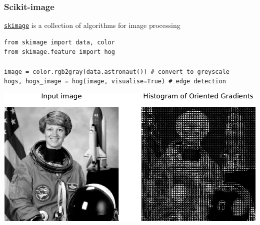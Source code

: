 \documentclass[pdf]{beamer}
\begin{document}
\begin{frame}[fragile]
\frametitle{Scikit-image}

\href{http://scikit-image.org/}{\texttt{skimage}} 
is a collection of algorithms for image processing 

\begin{lstlisting}[style=python]
from skimage import data, color
from skimage.feature import hog

image = color.rgb2gray(data.astronaut()) # convert to greyscale
hogs, hogs_image = hog(image, visualise=True) # edge detection
\end{lstlisting}

\vspace{-.5cm}
\centering
\includegraphics[width=.75\textwidth]{hogs.pdf}

\end{frame}
\end{document}
